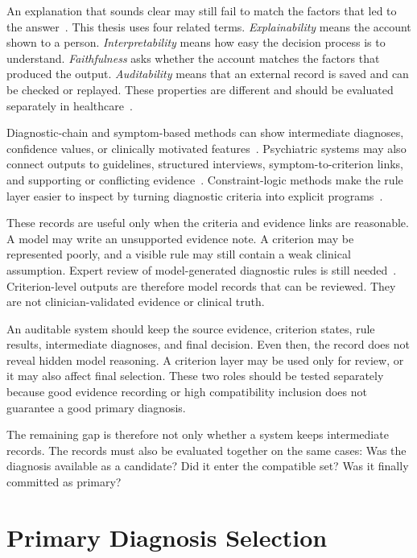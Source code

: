 An explanation that sounds clear may still fail to match the factors that led to the answer~\citep{turpin2023unfaithful}. This thesis uses four related terms. \emph{Explainability} means the account shown to a person. \emph{Interpretability} means how easy the decision process is to understand. \emph{Faithfulness} asks whether the account matches the factors that produced the output. \emph{Auditability} means that an external record is saved and can be checked or replayed. These properties are different and should be evaluated separately in healthcare~\citep{rudin2019stop,huang2024xiai}.

Diagnostic-chain and symptom-based methods can show intermediate diagnoses, confidence values, or clinically motivated features~\citep{chen2025cod,lee2026interpretable,lyu2026depllm}. Psychiatric systems may also connect outputs to guidelines, structured interviews, symptom-to-criterion links, and supporting or conflicting evidence~\citep{li2026mind,bi2025magi,ozgun2025dsm5agentflow}. Constraint-logic methods make the rule layer easier to inspect by turning diagnostic criteria into explicit programs~\citep{kim2025clp}.

These records are useful only when the criteria and evidence links are reasonable. A model may write an unsupported evidence note. A criterion may be represented poorly, and a visible rule may still contain a weak clinical assumption. Expert review of model-generated diagnostic rules is still needed~\citep{kim2025clp}. Criterion-level outputs are therefore model records that can be reviewed. They are not clinician-validated evidence or clinical truth.

An auditable system should keep the source evidence, criterion states, rule results, intermediate diagnoses, and final decision. Even then, the record does not reveal hidden model reasoning. A criterion layer may be used only for review, or it may also affect final selection. These two roles should be tested separately because good evidence recording or high compatibility inclusion does not guarantee a good primary diagnosis.

The remaining gap is therefore not only whether a system keeps intermediate records. The records must also be evaluated together on the same cases: Was the diagnosis available as a candidate? Did it enter the compatible set? Was it finally committed as primary?

\section{Primary Diagnosis Selection}

